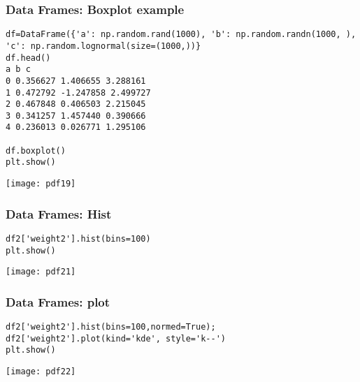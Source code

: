 \begin{frame}[fragile]
\frametitle{Data Frames: Boxplot example}
\begin{lstlisting}
df=DataFrame({'a': np.random.rand(1000), 'b': np.random.randn(1000, ), 'c': np.random.lognormal(size=(1000,))}
df.head()
a b c
0 0.356627 1.406655 3.288161
1 0.472792 -1.247858 2.499727
2 0.467848 0.406503 2.215045
3 0.341257 1.457440 0.390666
4 0.236013 0.026771 1.295106

df.boxplot()
plt.show()
\end{lstlisting}
\begin{center}
\texttt{[image: pdf19]}
\end{center}
\end{frame}



\begin{frame}[fragile]
\frametitle{Data Frames: Hist}
\begin{lstlisting}
df2['weight2'].hist(bins=100)
plt.show()
\end{lstlisting}
\begin{center}
\texttt{[image: pdf21]}
\end{center}
\end{frame}


\begin{frame}[fragile]
\frametitle{Data Frames: plot}
\begin{lstlisting}
df2['weight2'].hist(bins=100,normed=True); df2['weight2'].plot(kind='kde', style='k--')
plt.show()
\end{lstlisting}
\begin{center}
\texttt{[image: pdf22]}
\end{center}
\end{frame}

